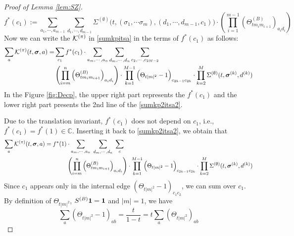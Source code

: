 \documentclass[10pt,reqno]{article}
\theoremstyle{plain} %
\theoremstyle{remark}
\numberwithin{equation}{section}
\begin{document}
\begin{proof}[ Proof of Lemma  \ref{lem:SZ}]
 $$
f^*(c_1):=\sum_{a_1,\cdots, a_{m-1}}\sum_{d_1,\cdots, d_{m-1}}\Sigma^{(\emptyset)}\Bigg(t, (\sigma_1, \cdots \sigma_m), (d_1,\cdots, d_{m-1}, c_1)\Bigg)\cdot  \left(\prod_{i=1}^{m-1}\left(\Theta^{(B)}_{tm_im_{i+1}}\right)_{a_id_i}\right) 
$$
Now we can write the $\cal K^{(\pi)}$ in \eqref{sumkpitsa} in the terms of $f^*(c_1)$ as follows: 
\begin{align}\label{sumkp2itsa2}
\sum_{\textbf{a}}{\cal K}^{(\pi)}(t, \boldsymbol{\sigma}, \textbf{a})=& \sum_{c_1} f^*(c_1)\cdot  
\sum_{a_m,\cdots , a_n}
\sum_{d_m,\cdots , d_n}
\sum_{c_2,\cdots,c_{2M-2}}\\\nonumber
&\left(\prod_{i=m}^{n}\left(\Theta^{(B)}_{tm_im_{i+1}}\right)_{a_id_i}\right)\cdot \prod_{k=1}^{M-1}\Big(\Theta_{{t|m|^2}}-1\Big)_{c_{2k-1}c_{2k}}
\cdot
 \prod_{k=2}^{M}{\Sigma}^{(\emptyset)}(t, \boldsymbol{\sigma}^{(k)}, \textbf{d}^{(k)})   
\end{align}
In the Figure \ref{fig:Decp}, the upper right part represents the $f ^*(c_1)$ and the lower right part presents the 2nd line of the \eqref{sumkp2itsa2}. 

Due to the translation invariant, $ f^*(c_1)$ does not depend on $c_1$, i.e.,  
$f^*(c_1)= f^*(1)\in \mathbb C$.
Inserting it  back to \eqref{sumkp2itsa2}, we obtain that
\begin{align}\label{sumkp3itsa3}
\sum_{\textbf{a}}{\cal K}^{(\pi)}(t, \boldsymbol{\sigma}, \textbf{a})=f^*(1) &\cdot  
\sum_{a_m,\cdots , a_n}\;
\sum_{d_m,\cdots , d_n}\;
\sum_{\textbf{c}}\\\nonumber
&\left(\prod_{i=m}^{n}\left(\Theta^{(B)}_{tm_im_{i+1}}\right)_{a_id_i}\right)\cdot \prod_{k=1}^{M-1}\Big(\Theta_{{t|m|^2}}-1\Big)_{c_{2k-1}c_{2k}}
\cdot
 \prod_{k=2}^{M}{\Sigma}^{(\emptyset)}(t, \boldsymbol{\sigma}^{(k)}, \textbf{d}^{(k)})   
\end{align}
Since   $c_1$  appears only  in the internal edge $ (\Theta_{{t|m|^2}}-1 )_{c_1c_2}$, we can sum over $c_1$. By definition of 
$\Theta_{{t|m|^2}}$,  $S^{(B)} \bf 1 = \bf 1$ and $|m|=1$, we have 
$$  \sum_{a}\left(\Theta_{t|m|^2}-1\right)_{ab}= \frac t { 1-t} =t \sum_{a}\left(\Theta_{t|m|^2}\right)_{ab}
$$


\end{proof}
\end{document}
